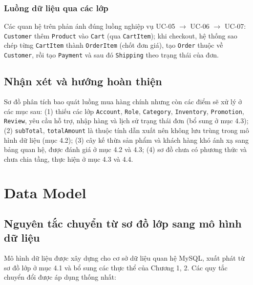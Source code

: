 \documentclass[12pt,a4paper,oneside]{report}
\begin{document}
\subsubsection*{Luồng dữ liệu qua các lớp}

Các quan hệ trên phản ánh đúng luồng nghiệp vụ UC-05 $\rightarrow$ UC-06 $\rightarrow$ UC-07: \texttt{Customer} thêm \texttt{Product} vào \texttt{Cart} (qua \texttt{CartItem}); khi checkout, hệ thống sao chép từng \texttt{CartItem} thành \texttt{OrderItem} (chốt đơn giá), tạo \texttt{Order} thuộc về \texttt{Customer}, rồi tạo \texttt{Payment} và sau đó \texttt{Shipping} theo trạng thái của đơn.

\subsection{Nhận xét và hướng hoàn thiện}

Sơ đồ phân tích bao quát luồng mua hàng chính nhưng còn các điểm sẽ xử lý ở các mục sau: (1) thiếu các lớp \texttt{Account}, \texttt{Role}, \texttt{Category}, \texttt{Inventory}, \texttt{Promotion}, \texttt{Review}, yêu cầu hỗ trợ, nhập hàng và lịch sử trạng thái đơn (bổ sung ở mục 4.3); (2) \texttt{subTotal}, \texttt{totalAmount} là thuộc tính dẫn xuất nên không lưu trùng trong mô hình dữ liệu (mục 4.2); (3) cây kế thừa sản phẩm và khách hàng khó ánh xạ sang bảng quan hệ, được đánh giá ở mục 4.2 và 4.3; (4) sơ đồ chưa có phương thức và chưa chia tầng, thực hiện ở mục 4.3 và 4.4.

\section{Data Model}

\subsection{Nguyên tắc chuyển từ sơ đồ lớp sang mô hình dữ liệu}

Mô hình dữ liệu được xây dựng cho cơ sở dữ liệu quan hệ MySQL, xuất phát từ sơ đồ lớp ở mục 4.1 và bổ sung các thực thể của Chương 1, 2. Các quy tắc chuyển đổi được áp dụng thống nhất:
\end{document}
